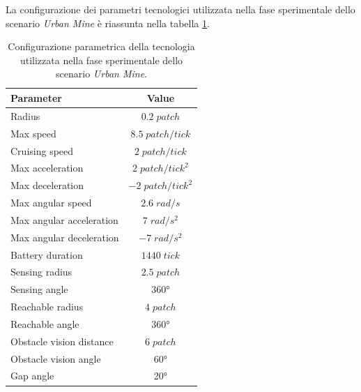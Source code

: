 La configurazione dei parametri tecnologici utilizzata nella fase sperimentale dello scenario \textit{Urban Mine} è  riassunta nella tabella \ref{tabella_parametri_urbanMine}.

\begin{table}[H]
    \centering
    \captionsetup{justification=centering, margin=2cm, font=footnotesize}
    \begin{tabular}{|l|c|}
    \hline
    \textbf{Parameter}              & \textbf{Value}                \\ \hline
    Radius                          & $0.2 \; patch$                \\ \hline
    Max speed                       & $8.5 \; patch/tick$           \\ \hline
    Cruising speed                  & $2 \; patch/tick$             \\ \hline
    Max acceleration                & $2 \; patch/tick^{2}$         \\ \hline
    Max deceleration                & $-2 \; patch/tick^{2}$        \\ \hline
    Max angular speed               & $2.6 \; rad/s$                \\ \hline
    Max angular acceleration        & $7 \; rad/s^{2}$              \\ \hline
    Max angular deceleration        & $-7 \; rad/s^{2}$             \\ \hline
    Battery duration                & $1440 \; tick$                \\ \hline
    Sensing radius                  & $2.5 \; patch$                \\ \hline
    Sensing angle                   & \ang{360}                        \\ \hline
    Reachable radius                & $4 \; patch$                  \\ \hline
    Reachable angle                 & \ang{360}                        \\ \hline
    Obstacle vision distance        & $6 \; patch$                  \\ \hline
    Obstacle vision angle           & \ang{60}                        \\ \hline
    Gap angle                       & \ang{20}                        \\ \hline
    \end{tabular}%
    
    \caption{Configurazione parametrica della tecnologia utilizzata nella fase sperimentale dello scenario \textit{Urban Mine}.}
    \label{tabella_parametri_urbanMine}
\end{table}

